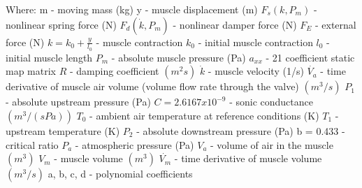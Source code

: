 \documentclass[11pt,a4paper]{article}
\begin{document}
\begin{appendices}
Where: \newline
m - moving mass (kg)\newline
y - muscle displacement (m)\newline
$F_s(k, P_m)$ - nonlinear spring force (N)\newline
$F_d(\dot{k}, P_m)$ - nonlinear damper force (N)\newline
$F_E$ - external force (N)\newline
$k = k_0 + \frac{y}{l_0}$ - muscle contraction\newline
$k_0$ - initial muscle contraction\newline
$l_0$ - initial muscle length\newline
$P_m$ - absolute muscle pressure (Pa)\newline
$a_{xx}$ - 21 coefficient static map matrix\newline
$R$ - damping coefficient $(m^2s)$\newline
$\dot{k}$ - muscle velocity (1/s)\newline
$\dot{V_a}$ - time derivative of muscle air volume (volume flow rate through the valve) $(m^3/s)$
$P_1$ - absolute upstream pressure (Pa)\newline
$C = 2.6167x10^{-9}$ - sonic conductance $(m^3/(sPa))$\newline
$T_0$ - ambient air temperature at reference conditions (K)\newline
$T_1$ - upstream temperature (K)\newline
$P_2$ - absolute downstream pressure (Pa)\newline
b = 0.433 - critical ratio\newline
$P_a$ - atmospheric pressure (Pa)\newline
$V_a$ - volume of air in the muscle $(m^3)$\newline
$V_m$ - muscle volume $(m^3)$\newline
$\dot{V_m}$ - time derivative of muscle volume $(m^3/s)$\newline
a, b, c, d - polynomial coefficients

\clearpage
\end{appendices}

\printbibliography
\end{document}
